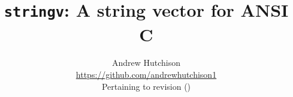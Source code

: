 \documentclass[a4paper]{article}
\title{\texttt{stringv}: A string vector for ANSI C}
\author{%
    Andrew Hutchison \\%
    \url{https://github.com/andrewhutchison1} \\%
    Pertaining to revision \gitAbbrevHash (\gitAuthorDate)}
\begin{document}
\maketitle

\begin{abstract}

\end{abstract}

\tableofcontents
\end{document}
